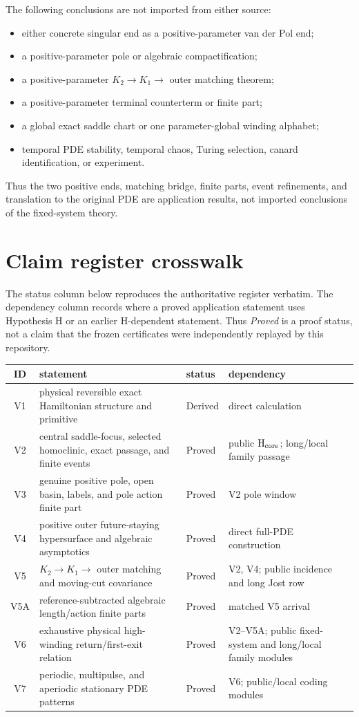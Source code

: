\documentclass[11pt,reqno]{amsart}
\begin{document}
The following conclusions are not imported from either source:
\begin{itemize}
 \item either concrete singular end as a positive-parameter van der Pol end;
 \item a positive-parameter pole or algebraic compactification;
 \item a positive-parameter $K_2\to K_1\to$ outer matching theorem;
 \item a positive-parameter terminal counterterm or finite part;
 \item a global exact saddle chart or one parameter-global winding alphabet;
 \item temporal PDE stability, temporal chaos, Turing selection, canard
 identification, or experiment.
\end{itemize}
Thus the two positive ends, matching bridge, finite parts, event refinements,
and translation to the original PDE are application results, not imported
conclusions of the fixed-system theory.

\section{Claim register crosswalk}

The status column below reproduces the authoritative register verbatim.  The
dependency column records where a proved application statement uses
Hypothesis H or an earlier H-dependent statement.  Thus \emph{Proved} is a
proof status, not a claim that the frozen certificates were independently
replayed by this repository.

\begin{center}
\small
\begin{tabular}{@{}c|p{4.8cm}|p{2.1cm}|p{2.9cm}@{}}
 ID & statement & status & dependency \\
 \hline
 V1 & physical reversible exact Hamiltonian structure and primitive
    & Derived & direct calculation \\
 V2 & central saddle-focus, selected homoclinic, exact passage, and finite events
    & Proved & public ${\rm H_{core}}$; long/local family passage \\
 V3 & genuine positive pole, open basin, labels, and pole action finite part
    & Proved & V2 pole window \\
 V4 & positive outer future-staying hypersurface and algebraic asymptotics
    & Proved & direct full-PDE construction \\
 V5 & $K_2\to K_1\to$ outer matching and moving-cut covariance
    & Proved & V2, V4; public incidence and long Jost row \\
 V5A & reference-subtracted algebraic length/action finite parts
    & Proved & matched V5 arrival \\
 V6 & exhaustive physical high-winding return/first-exit relation
    & Proved & V2--V5A; public fixed-system and long/local family modules \\
 V7 & periodic, multipulse, and aperiodic stationary PDE patterns
    & Proved & V6; public/local coding modules \\
\end{tabular}
\end{center}
\end{document}
